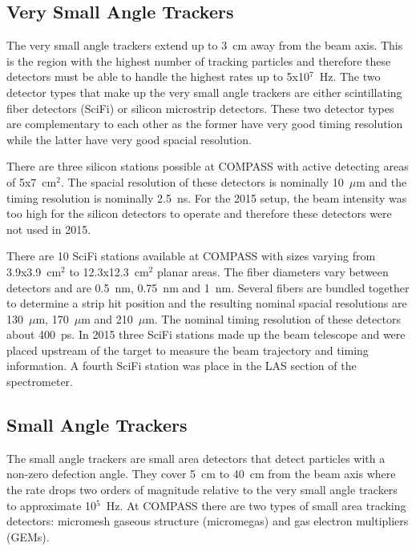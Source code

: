 \subsection{Very Small Angle Trackers}
The very small angle trackers extend up to 3~cm away from the beam axis.  This
is the region with the highest number of tracking particles and therefore these
detectors must be able to handle the highest rates up to 5x10$^7$~Hz.  The two
detector types that make up the very small angle trackers are either
scintillating fiber detectors (SciFi) or silicon microstrip detectors.  These
two detector types are complementary to each other as the former have very good
timing resolution while the latter have very good spacial resolution. \par

There are three silicon stations possible at COMPASS with active detecting areas
of 5x7~cm$^2$.  The spacial resolution of these detectors is nominally 10~$\mu$m
and the timing resolution is nominally 2.5~ns.  For the 2015 setup, the beam
intensity was too high for the silicon detectors to operate and therefore these
detectors were not used in 2015. \par

There are 10 SciFi stations available at COMPASS with sizes varying from
3.9x3.9~cm$^2$ to 12.3x12.3~cm$^2$ planar areas.  The fiber diameters vary
between detectors and are 0.5~nm, 0.75~nm and 1~nm.  Several fibers are bundled
together to determine a strip hit position and the resulting nominal spacial
resolutions are 130~$\mu$m, 170~$\mu$m and 210~$\mu$m.  The nominal timing
resolution of these detectors about 400~ps.  In 2015 three SciFi stations made
up the beam telescope and were placed upstream of the target to measure the beam
trajectory and timing information.  A fourth SciFi station was place in the LAS
section of the spectrometer. \par

\subsection{Small Angle Trackers} \label{sec::SAT}
The small angle trackers are small area detectors that detect particles with a
non-zero defection angle.  They cover 5~cm to 40~cm from the beam axis where the
rate drops two orders of magnitude relative to the very small angle trackers to
approximate 10$^5$~Hz.  At COMPASS there are two types of small area tracking
detectors: micromesh gaseous structure (micromegas) and gas electron multipliers
(GEMs). \par

